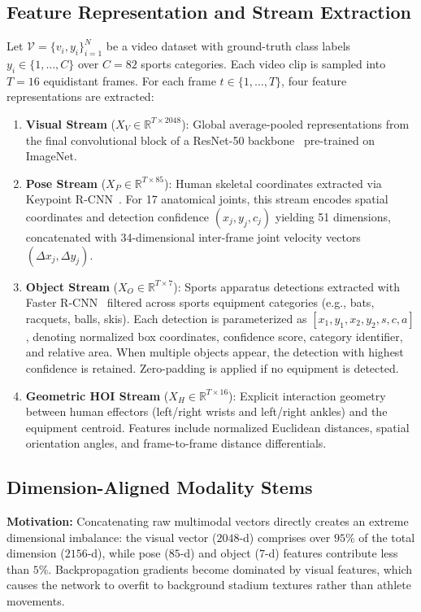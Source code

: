 \documentclass[conference]{IEEEtran}
\begin{document}
\subsection{Feature Representation and Stream Extraction}
Let $\mathcal{V} = \{v_i, y_i\}_{i=1}^N$ be a video dataset with ground-truth class labels $y_i \in \{1, \dots, C\}$ over $C = 82$ sports categories. Each video clip is sampled into $T = 16$ equidistant frames. For each frame $t \in \{1, \dots, T\}$, four feature representations are extracted:

\begin{enumerate}
    \item \textbf{Visual Stream} ($X_V \in \mathbb{R}^{T \times 2048}$): Global average-pooled representations from the final convolutional block of a ResNet-50 backbone~\cite{he2016deep} pre-trained on ImageNet.
    \item \textbf{Pose Stream} ($X_P \in \mathbb{R}^{T \times 85}$): Human skeletal coordinates extracted via Keypoint R-CNN~\cite{he2017mask}. For 17 anatomical joints, this stream encodes spatial coordinates and detection confidence $(x_j, y_j, c_j)$ yielding 51 dimensions, concatenated with 34-dimensional inter-frame joint velocity vectors $(\Delta x_j, \Delta y_j)$.
    \item \textbf{Object Stream} ($X_O \in \mathbb{R}^{T \times 7}$): Sports apparatus detections extracted with Faster R-CNN~\cite{ren2015faster} filtered across sports equipment categories (e.g., bats, racquets, balls, skis). Each detection is parameterized as $[x_1, y_1, x_2, y_2, s, c, a]$, denoting normalized box coordinates, confidence score, category identifier, and relative area. When multiple objects appear, the detection with highest confidence is retained. Zero-padding is applied if no equipment is detected.
    \item \textbf{Geometric HOI Stream} ($X_H \in \mathbb{R}^{T \times 16}$): Explicit interaction geometry between human effectors (left/right wrists and left/right ankles) and the equipment centroid. Features include normalized Euclidean distances, spatial orientation angles, and frame-to-frame distance differentials.
\end{enumerate}

\subsection{Dimension-Aligned Modality Stems}
\textbf{Motivation:} Concatenating raw multimodal vectors directly creates an extreme dimensional imbalance: the visual vector ($2048$-d) comprises over $95\%$ of the total dimension ($2156$-d), while pose ($85$-d) and object ($7$-d) features contribute less than $5\%$. Backpropagation gradients become dominated by visual features, which causes the network to overfit to background stadium textures rather than athlete movements.
\end{document}
